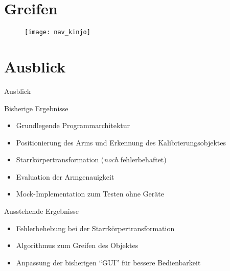 
\section{Greifen}

\begin{frame}[b]
	\begin{figure}
		\texttt{[image: nav\_kinjo]}
	\end{figure}
	\vspace*{0.7cm}
\end{frame}

\section{Ausblick}

\begin{frame}{Ausblick}
	\begin{block}{Bisherige Ergebnisse}
		\begin{itemize}
			\item Grundlegende Programmarchitektur
			\item Positionierung des Arms und Erkennung des
				Kalibrierungsobjektes
			\item Starrkörpertransformation (\emph{noch} fehlerbehaftet)
			\item Evaluation der Armgenauigkeit
			\item Mock-Implementation zum Testen ohne Geräte
		\end{itemize}
	\end{block}
	\begin{block}{Ausstehende Ergebnisse}
		\begin{itemize}
			\item Fehlerbehebung bei der Starrkörpertransformation
			\item Algorithmus zum Greifen des Objektes
			\item Anpassung der bisherigen \enquote{GUI} für bessere
				Bedienbarkeit
		\end{itemize}
	\end{block}
\end{frame}

